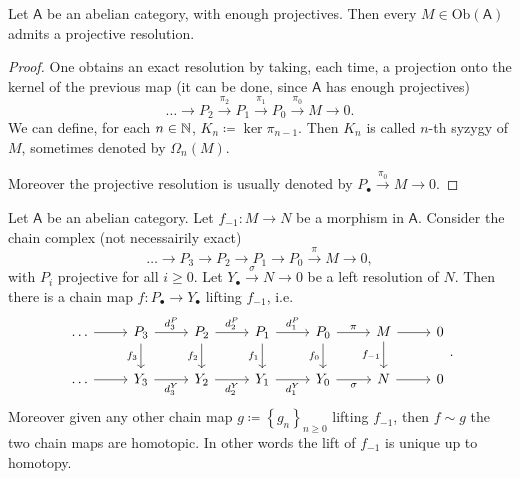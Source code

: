 \begin{lem}
	Let $\mathsf{A}$ be an abelian category, with enough projectives.
	Then every $M \in \mathrm{Ob} \left(\mathsf{A}\right)$ admits a
	projective resolution.
\end{lem} 
\begin{proof}
	One obtains an exact resolution by taking, each time, a projection onto the kernel of the previous map
	(it can be done, since $\mathsf{A}$ has enough projectives)
	\begin{equation}
	\ldots \to P_2 \xrightarrow{\pi_2} P_1 \xrightarrow{\pi_1} P_0 \xrightarrow{\pi_0} M \to 0
	.\end{equation} 
	We can define, for each $n \in \mathbb{N}$, $K_n \coloneqq \ker \pi_{n-1}$.
	Then $K_n$ is called $n$-th syzygy of $M$, sometimes
	denoted by $\Omega_n(M)$.

	Moreover the projective resolution is usually
	denoted by $P_{\bullet} \xrightarrow{\pi_0} M \to 0$.
\end{proof}

\begin{thm}[Comparison]
	Let $\mathsf{A}$ be an abelian category.
	Let $f_{-1}\colon M \to N$ be a morphism in $\mathsf{A}$.
	Consider the chain complex (not necessairily exact)
	\begin{equation}
	\ldots \to P_3 \to P_2 \to P_1 \to P_0 \xrightarrow{\pi} 
	M \to 0
	,\end{equation} 
	with $P_i$ projective for all $i \geq 0$.
	Let $Y_{\bullet} \xrightarrow{\sigma} N \to 0$ be a left resolution of $N$.
	Then there is a chain map $f\colon P_{\bullet} \to Y_{\bullet}$ lifting $f_{-1}$,
	i.e.
	\begin{equation}
	\begin{tikzcd}
		\ldots \arrow[r, "", rightarrow] &
		P_3 \arrow[r, "d_3^P", rightarrow] \arrow[d, "f_3"', rightarrow] &
		P_2 \arrow[r, "d_2^P", rightarrow] \arrow[d, "f_2"', rightarrow] &
		P_1 \arrow[r, "d_1^P", rightarrow] \arrow[d, "f_1"', rightarrow] &
		P_0 \arrow[r, "\pi", rightarrow] \arrow[d, "f_0"', rightarrow] &
		M \arrow[r, "", rightarrow] \arrow[d, "f_{-1}"', rightarrow] &
		0\\
		\ldots \arrow[r, "", rightarrow] &
		Y_3 \arrow[r, "d_3^Y"', rightarrow] &
		Y_2 \arrow[r, "d_2^Y"', rightarrow] &
		Y_1 \arrow[r, "d_1^Y"', rightarrow] &
		Y_0 \arrow[r, "\sigma"', rightarrow] &
		N \arrow[r, "", rightarrow] &
		0
	\end{tikzcd}
	.\end{equation} 
	Moreover given any other chain map $g \coloneqq \left\{ g_n \right\}_{n \geq 0}$
	lifting $f_{-1}$, then $f \sim g$ the two chain maps are homotopic.
	In other words the lift of $f_{-1}$ is unique up to homotopy.
\end{thm}

